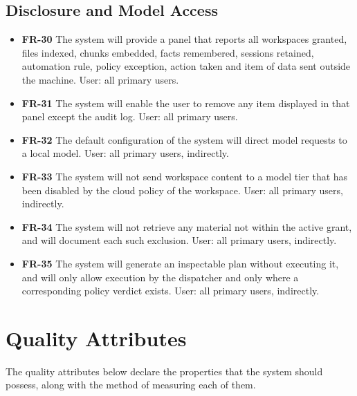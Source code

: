 \documentclass{FastFyp}
\begin{document}
\subsection{Disclosure and Model Access}
\begin{itemize}
    \item \textbf{FR-30} The system will provide a panel that reports all workspaces granted, files indexed, chunks embedded, facts remembered, sessions retained, automation rule, policy exception, action taken and item of data sent outside the machine. User: all primary users.
    \item \textbf{FR-31} The system will enable the user to remove any item displayed in that panel except the audit log. User: all primary users.
    \item \textbf{FR-32} The default configuration of the system will direct model requests to a local model. User: all primary users, indirectly.
    \item \textbf{FR-33} The system will not send workspace content to a model tier that has been disabled by the cloud policy of the workspace. User: all primary users, indirectly.
    \item \textbf{FR-34} The system will not retrieve any material not within the active grant, and will document each such exclusion. User: all primary users, indirectly.
    \item \textbf{FR-35} The system will generate an inspectable plan without executing it, and will only allow execution by the dispatcher and only where a corresponding policy verdict exists. User: all primary users, indirectly.
\end{itemize}

\section{Quality Attributes}
The quality attributes below declare the properties that the system should possess, along with the method of measuring each of them.
\end{document}
